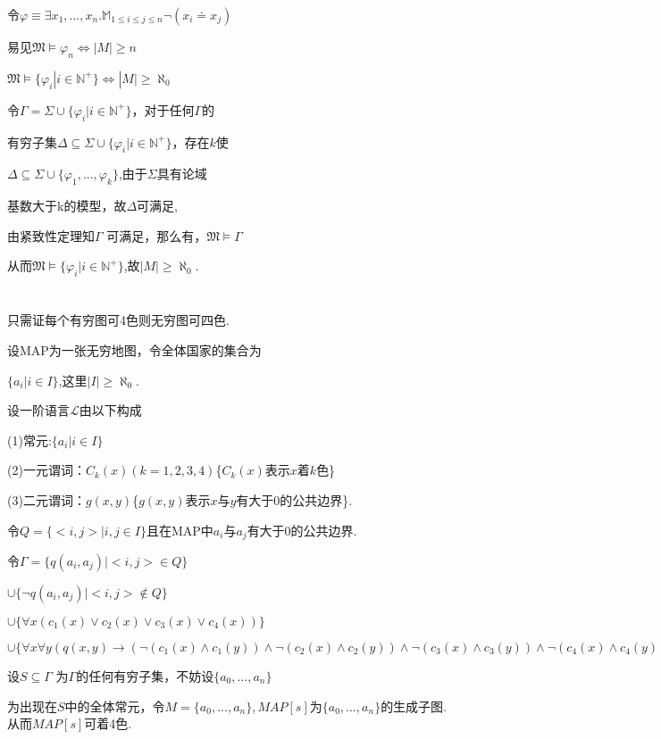 \documentclass{article}
\begin{document}
令$\varphi \equiv \exists x_1,...,x_n. \mathbb{M}_{1\leq i\leq j\leq n} \neg (x_i \doteq x_j)$

易见$\mathfrak{M} \models \varphi_n \Longleftrightarrow |M|\geq n$

$\mathfrak{M} \models \{ \varphi_i | i\in \mathbb{N}^+ \} \Leftrightarrow |M|\geq \aleph_0$

令$\Gamma =\Sigma \cup \{ \varphi_i | i \in \mathbb{N}^+ \}$，对于任何$\Gamma$的

有穷子集$\Delta \subseteq \Sigma \cup \{ \varphi_i | i  \in \mathbb{N}^+ \} $，存在$k$使

$\Delta \subseteq \Sigma \cup \{ \varphi_1 ,..., \varphi_k\} $,由于$\Sigma$具有论域

基数大于k的模型，故$\Delta$可满足,

由紧致性定理知$\Gamma$ 可满足，那么有，$\mathfrak{M}\vDash \Gamma$

从而$\mathfrak{M} \vDash \{ \varphi_i | i  \in \mathbb{N}^+\}$,故$|M|\geq \aleph_0$.


\section{}

只需证每个有穷图可4色则无穷图可四色.

设MAP为一张无穷地图，令全体国家的集合为

$\{a_i |i\in I\}$,这里$|I|\geq \aleph_0$.

设一阶语言$\mathcal{L}$由以下构成

(1)常元:$\{a_i | i\in I\}$

(2)一元谓词：$C_k (x) (k=1,2,3,4)$\{$C_k (x)$表示$x$着$k$色\}

(3)二元谓词：$g(x,y)$\{$g(x,y)$表示$x$与$y$有大于0的公共边界\}.

令$Q = \{<i,j>|i,j\in I\}$且在MAP中$a_i$与$a_j$有大于0的公共边界.

令$\Gamma = \{q(a_i,a_j) | <i,j> \in Q\}$

$\cup \{\neg q(a_i,a_j) | <i,j> \notin Q\}$

$\cup\{ \forall x(c_1(x)\vee c_2(x)\vee c_3(x)\vee c_4(x))\}$

$\cup\{ \forall x \forall y (q(x, y)\rightarrow (\neg (c_1(x)\wedge c_1(y))  \wedge \neg(c_2(x)\wedge c_2(y))\wedge \neg(c_3(x)\wedge c_3(y))\wedge \neg(c_4(x)\wedge c_4(y))))\}$

设$S\subseteq \Gamma$ 为$\Gamma$的任何有穷子集，不妨设$\{a_0,...,a_n\}$

为出现在$S$中的全体常元，令$M=\{a_0,...,a_n\},MAP[s]$为$\{a_0,\dots,a_n\}$的生成子图. 	从而$MAP[s]$可着4色. 
\end{document}
